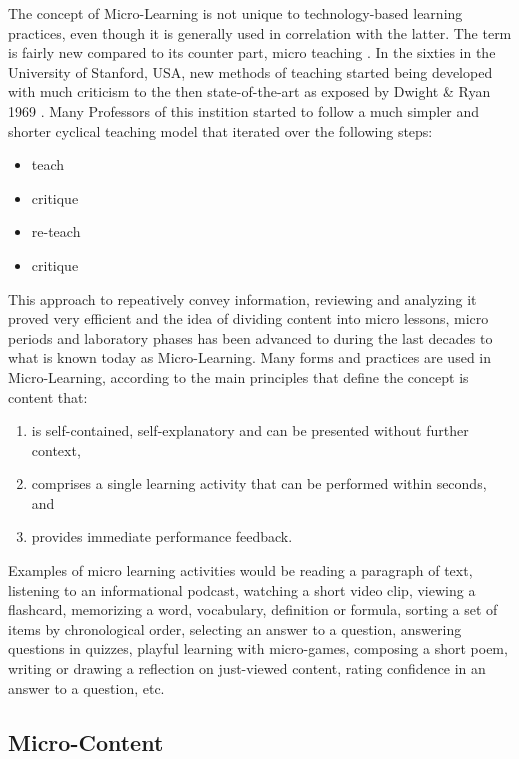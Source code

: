The concept of Micro-Learning is not unique to technology-based learning practices,
even though it is generally used in correlation with the latter. The term is fairly
new compared to its counter part, micro teaching \cite{microlearningdimensions}. 
In the sixties in the University of Stanford, USA, new methods of teaching started 
being developed with much criticism to the then state-of-the-art as exposed by 
Dwight \& Ryan 1969 \cite{dwight_ryan_1969}. Many Professors of this instition started
to follow a much simpler and shorter cyclical teaching model that iterated over
the following steps:

\begin{itemize}
    \item teach
    \item critique
    \item re-teach
    \item critique
\end{itemize}

This approach to repeatively convey information, reviewing and analyzing it proved
very efficient and the idea of dividing content into micro lessons, micro periods and
laboratory phases has been advanced to during the last decades to what is known today
as Micro-Learning. 
Many forms and practices are used in Micro-Learning, according to 
\cite{webservicearchitectureforsocialmicrolearning} the main 
principles that define the concept is content that:

\begin{enumerate}
    \item is self-contained, self-explanatory and can be presented without further context,
    \item comprises a single learning activity that can be performed within seconds, and
    \item provides immediate performance feedback.
\end{enumerate}


Examples of micro learning activities would be reading a paragraph of text, 
listening to an informational podcast, watching a short video clip, viewing a 
flashcard, memorizing a word, vocabulary, definition or formula, sorting a set
of items by chronological order, selecting an answer to a question, answering 
questions in quizzes, playful learning with micro-games, composing a short poem,
writing or drawing a reflection on just-viewed content, rating confidence in an 
answer to a question, etc.


\subsection{Micro-Content}

